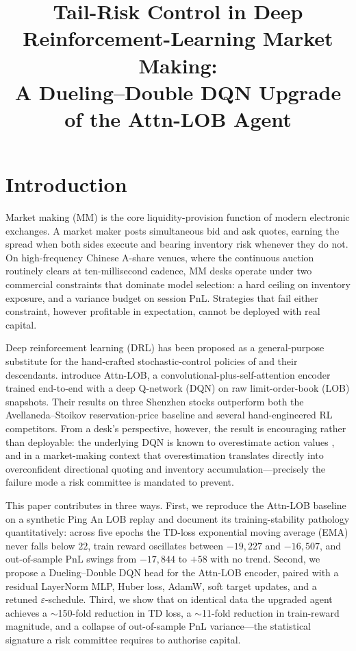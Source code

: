 \documentclass[12pt]{article}
\title{\textbf{Tail-Risk Control in Deep Reinforcement-Learning Market Making:\\
A Dueling--Double DQN Upgrade of the Attn-LOB Agent}}
\author{}
\date{}
\newcommand{\textcite}[1]{\citet{#1}}
\newcommand{\parencite}[1]{\citep{#1}}
\begin{document}
\maketitle

\section{Introduction}

Market making (MM) is the core liquidity-provision function of modern electronic exchanges. A market maker posts simultaneous bid and ask quotes, earning the spread when both sides execute and bearing inventory risk whenever they do not. On high-frequency Chinese A-share venues, where the continuous auction routinely clears at ten-millisecond cadence, MM desks operate under two commercial constraints that dominate model selection: a hard ceiling on inventory exposure, and a variance budget on session PnL. Strategies that fail either constraint, however profitable in expectation, cannot be deployed with real capital.

Deep reinforcement learning (DRL) has been proposed as a general-purpose substitute for the hand-crafted stochastic-control policies of \textcite{AS2008} and their descendants. \textcite{Guo2023} introduce Attn-LOB, a convolutional-plus-self-attention encoder trained end-to-end with a deep Q-network (DQN) on raw limit-order-book (LOB) snapshots. Their results on three Shenzhen stocks outperform both the Avellaneda--Stoikov reservation-price baseline and several hand-engineered RL competitors. From a desk's perspective, however, the result is encouraging rather than deployable: the underlying DQN is known to overestimate action values \parencite{vanHasselt2016}, and in a market-making context that overestimation translates directly into overconfident directional quoting and inventory accumulation---precisely the failure mode a risk committee is mandated to prevent.

This paper contributes in three ways. First, we reproduce the Attn-LOB baseline on a synthetic Ping An LOB replay and document its training-stability pathology quantitatively: across five epochs the TD-loss exponential moving average (EMA) never falls below $22$, train reward oscillates between $-19{,}227$ and $-16{,}507$, and out-of-sample PnL swings from $-17{,}844$ to $+58$ with no trend. Second, we propose a Dueling--Double DQN head for the Attn-LOB encoder, paired with a residual LayerNorm MLP, Huber loss, AdamW, soft target updates, and a retuned $\varepsilon$-schedule. Third, we show that on identical data the upgraded agent achieves a $\sim$150-fold reduction in TD loss, a $\sim$11-fold reduction in train-reward magnitude, and a collapse of out-of-sample PnL variance---the statistical signature a risk committee requires to authorise capital.
\end{document}
